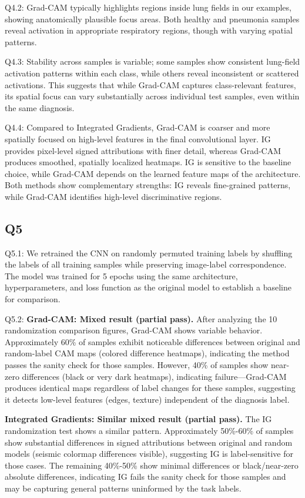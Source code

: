 Q4.2: Grad-CAM typically highlights regions inside lung fields in our examples, showing anatomically plausible focus areas. Both healthy and pneumonia samples reveal activation in appropriate respiratory regions, though with varying spatial patterns.

Q4.3: Stability across samples is variable; some samples show consistent lung-field activation patterns within each class, while others reveal inconsistent or scattered activations. This suggests that while Grad-CAM captures class-relevant features, its spatial focus can vary substantially across individual test samples, even within the same diagnosis.

Q4.4: Compared to Integrated Gradients, Grad-CAM is coarser and more spatially focused on high-level features in the final convolutional layer. IG provides pixel-level signed attributions with finer detail, whereas Grad-CAM produces smoothed, spatially localized heatmaps. IG is sensitive to the baseline choice, while Grad-CAM depends on the learned feature maps of the architecture. Both methods show complementary strengths: IG reveals fine-grained patterns, while Grad-CAM identifies high-level discriminative regions.

\subsection*{Q5}
Q5.1: We retrained the CNN on randomly permuted training labels by shuffling the labels of all training samples while preserving image-label correspondence. The model was trained for 5 epochs using the same architecture, hyperparameters, and loss function as the original model to establish a baseline for comparison.

Q5.2: \textbf{Grad-CAM: Mixed result (partial pass).} After analyzing the 10 randomization comparison figures, Grad-CAM shows variable behavior. Approximately 60\% of samples exhibit noticeable differences between original and random-label CAM maps (colored difference heatmaps), indicating the method passes the sanity check for those samples. However, 40\% of samples show near-zero differences (black or very dark heatmaps), indicating failure---Grad-CAM produces identical maps regardless of label changes for these samples, suggesting it detects low-level features (edges, texture) independent of the diagnosis label.

\textbf{Integrated Gradients: Similar mixed result (partial pass).} The IG randomization test shows a similar pattern. Approximately 50\%-60\% of samples show substantial differences in signed attributions between original and random models (seismic colormap differences visible), suggesting IG is label-sensitive for those cases. The remaining 40\%-50\% show minimal differences or black/near-zero absolute differences, indicating IG fails the sanity check for those samples and may be capturing general patterns uninformed by the task labels.

